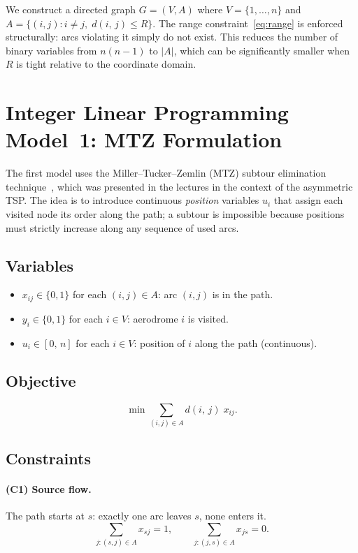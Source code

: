\documentclass[12pt, a4paper]{article}
\newcommand{\dist}[2]{d(#1,\,#2)}
\begin{document}
We construct a directed graph $G = (V, A)$ where $V = \{1,\ldots,n\}$ and
$A = \{(i,j) : i \neq j,\;\dist{i}{j} \leq R\}$.
The range constraint~\eqref{eq:range} is enforced structurally: arcs violating it
simply do not exist. This reduces the number of binary variables from $n(n{-}1)$ to
$|A|$, which can be significantly smaller when $R$ is tight relative to the
coordinate domain.


\section{Integer Linear Programming Model~1: MTZ Formulation}

The first model uses the Miller--Tucker--Zemlin (MTZ) subtour elimination
technique~\cite{mtz}, which was presented in the lectures in the context of
the asymmetric TSP. The idea is to introduce continuous \emph{position} variables
$u_i$ that assign each visited node its order along the path; a subtour is
impossible because positions must strictly increase along any sequence of used arcs.

\subsection{Variables}

\begin{itemize}[nosep]
  \item $x_{ij} \in \{0,1\}$ for each $(i,j) \in A$: arc $(i,j)$ is in the path.
  \item $y_i \in \{0,1\}$ for each $i \in V$: aerodrome $i$ is visited.
  \item $u_i \in [0,\,n]$ for each $i \in V$: position of $i$ along the path
        (continuous).
\end{itemize}

\subsection{Objective}

\[
  \min \sum_{(i,j) \in A} \dist{i}{j}\; x_{ij}.
\]

\subsection{Constraints}

\paragraph{(C1) Source flow.}
The path starts at $s$: exactly one arc leaves $s$, none enters it.
\[
  \sum_{j:(s,j)\in A} x_{sj} = 1, \qquad
  \sum_{j:(j,s)\in A} x_{js} = 0.
\]
\end{document}
